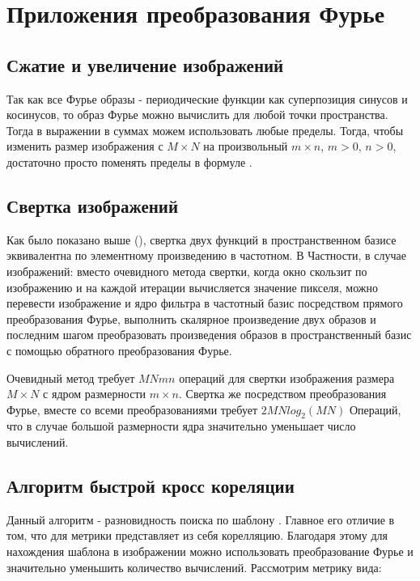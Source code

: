 \documentclass[oneside,final,14pt]{extreport}
\begin{document}
\chapter{ Приложения преобразования Фурье }
\section{Сжатие и увеличение изображений}
Так как все Фурье образы - периодические функции как суперпозиция синусов и косинусов, то образ Фурье можно вычислить для любой точки пространства. Тогда в выражении   
 в суммах можем использовать любые пределы.
Тогда, чтобы изменить размер изображения с $M\times N$ на произвольный $m\times n$, $m >0$, $n > 0$, достаточно просто поменять пределы в формуле .

\section{Свертка изображений}

Как было показано выше (), свертка двух функций в пространственном базисе эквивалентна по элементному произведению в частотном. В Частности, в случае изображений: вместо очевидного метода свертки, когда окно скользит по изображению и на каждой итерации вычисляется значение пикселя, можно перевести изображение и ядро фильтра в частотный базис посредством прямого преобразования Фурье, выполнить скалярное произведение двух образов и последним шагом преобразовать произведения образов в пространственный базис с помощью обратного преобразования Фурье. 

Очевидный метод требует $MNmn$ операций для свертки изображения размера $M\times N$ с ядром размерности $m\times n$. Свертка же посредством преобразования Фурье, вместе со всеми преобразованиями требует $2MNlog_2(MN)$ Операций, что в случае большой размерности ядра значительно уменьшает число вычислений. 

\section{Алгоритм быстрой  кросс кореляции}
Данный алгоритм  - разновидность поиска по шаблону \cite{Cross-Correlation}. Главное его отличие в том, что для метрики представляет из себя корелляцию. Благодаря этому для нахождения шаблона в изображении можно использовать преобразование Фурье и значительно уменьшить количество вычислений. 
Рассмотрим метрику вида:
\end{document}
